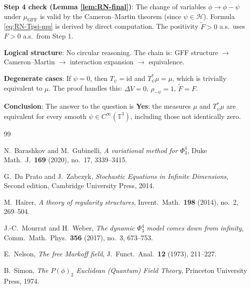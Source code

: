 \documentclass[12pt]{article}
\begin{document}
\textbf{Step 4 check (Lemma \ref{lem:RN-final})}: The change of variables $\phi \to \phi - \psi$ under $\mu_{\mathrm{GFF}}$ is valid by the Cameron--Martin theorem (since $\psi \in \mathcal{H}$). Formula \eqref{eq:RN-Tpsi-mu} is derived by direct computation. The positivity $\tilde{F} > 0$ a.s.\ uses $F > 0$ a.s.\ from Step 1.

\textbf{Logical structure}: No circular reasoning. The chain is: GFF structure $\to$ Cameron--Martin $\to$ interaction expansion $\to$ equivalence.

\textbf{Degenerate cases}: If $\psi = 0$, then $T_\psi = \text{id}$ and $T_\psi^* \mu = \mu$, which is trivially equivalent to $\mu$. The proof handles this: $\Delta V = 0$, $\rho_{-\psi} = 1$, $\tilde{F} = F$.

\textbf{Conclusion}: The answer to the question is \textbf{Yes}: the measures $\mu$ and $T_\psi^* \mu$ are equivalent for every smooth $\psi \in C^\infty(\mathbb{T}^3)$, including those not identically zero.

\begin{thebibliography}{99}

N.\ Barashkov and M.\ Gubinelli,
\textit{A variational method for $\Phi^4_3$},
Duke Math.\ J.\ \textbf{169} (2020), no.\ 17, 3339--3415.

G.\ Da Prato and J.\ Zabczyk,
\textit{Stochastic Equations in Infinite Dimensions},
Second edition, Cambridge University Press, 2014.

M.\ Hairer,
\textit{A theory of regularity structures},
Invent.\ Math.\ \textbf{198} (2014), no.\ 2, 269--504.

J.-C.\ Mourrat and H.\ Weber,
\textit{The dynamic $\Phi^4_3$ model comes down from infinity},
Comm.\ Math.\ Phys.\ \textbf{356} (2017), no.\ 3, 673--753.

E.\ Nelson,
\textit{The free Markoff field},
J.\ Funct.\ Anal.\ \textbf{12} (1973), 211--227.

B.\ Simon,
\textit{The $P(\phi)_2$ Euclidean (Quantum) Field Theory},
Princeton University Press, 1974.

\end{thebibliography}
\end{document}
